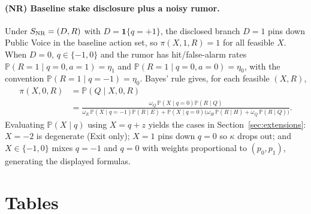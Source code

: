 \documentclass[11pt]{article}
\newcommand{\PP}{\mathbb{P}}
\newcommand{\1}{\mathbf{1}}
\begin{document}
\paragraph{(NR) Baseline stake disclosure plus a noisy rumor.}
Under $S_{\textup{NR}}=(D,R)$ with $D=\1\{q=+1\}$, the disclosed branch $D=1$ pins down Public Voice in the baseline action set, so $\pi(X,1,R)=1$ for all feasible $X$.
When $D=0$, $q\in\{-1,0\}$ and the rumor has hit/false-alarm rates $\PP(R=1 \mid q=0,a=1)=\eta_1$ and $\PP(R=1 \mid q=0,a=0)=\eta_0$, with the convention $\PP(R=1 \mid q=-1)=\eta_0$.
Bayes' rule gives, for each feasible $(X,R)$,
\begin{align*}
\pi(X,0,R)
&=\PP(Q \mid X,0,R)\\
&=\frac{\omega_Q\,\PP(X \mid q=0)\PP(R \mid Q)}
{\omega_E\,\PP(X \mid q=-1)\PP(R \mid E)+\PP(X \mid q=0)\big(\omega_H\,\PP(R \mid H)+\omega_Q\,\PP(R \mid Q)\big)}.
\end{align*}
Evaluating $\PP(X \mid q)$ using $X=q+z$ yields the cases in Section~\ref{sec:extensions}: $X=-2$ is degenerate (Exit only); $X=1$ pins down $q=0$ so $\kappa$ drops out; and $X\in\{-1,0\}$ mixes $q=-1$ and $q=0$ with weights proportional to $(p_0,p_1)$, generating the displayed formulas.

\section{Tables}
\label{app:tables}


\setcounter{table}{0}
\renewcommand{\thetable}{\thesection.\arabic{table}}
\renewcommand*{\theHtable}{\thesection.\arabic{table}}

\begin{table}[H]
\centering

\caption{Baseline numerical equilibrium (values rounded to two decimals). Parameters: $\mu=1$, $\sigma_v=0.5$, $\sigma_\varepsilon=0.5$, $\delta=0.95$, $\Delta=0.25$, $C_0=0.25$, $\chi=0.5$, $\kappa=0.5$, $m_0=0.10$, $m_1=0.45$, $\bar{S}=1.10$, $\Delta_S=0.30$, $K=0.15$, $s_\xi=0.15$, $\lambda_B=0.20$, $\rho=0.9$. Cutoffs: $k_1$, $k_0$, and $k_D$ (see updated numerical output).}
\label{tab:example}
\end{table}

\begin{table}[H]
\centering

\caption{Illustration of posterior engagement probabilities under alternative disclosure signals (Section~\ref{sec:extensions}), evaluated at the baseline calibrated equilibrium cutoffs and $\kappa=0.5$. For NR, the rumor parameters are set to $(\eta_1,\eta_0)=(0.75,0.25)$.}
\label{tab:disclosure-extensions}
\end{table}
\end{document}
